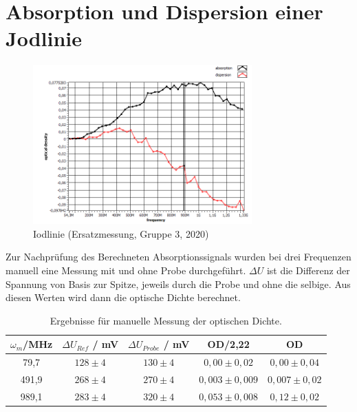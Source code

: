 
\newpage
\section{Absorption und Dispersion einer Jodlinie}


\begin{figure}[h]
    \centering
    \includegraphics[width=0.75\textwidth]{Bilder/Jodlinie/Gruppe32020Iododgraph1 Kopie.png}
    \caption[Iodlinie]{Iodlinie (Ersatzmessung, Gruppe 3, 2020)}
\end{figure}


Zur Nachprüfung des Berechneten Absorptionssignals wurden bei drei Frequenzen manuell eine Messung mit und ohne Probe durchgeführt. $\Delta U$ ist die Differenz der Spannung von Basis zur Spitze, jeweils durch die Probe und ohne die selbige. Aus diesen Werten wird dann die optische Dichte berechnet.


\begin{table}[h]
    \centering
    \begin{tabular}{c|cc|cc}
        $\omega_m$/MHz & $\Delta U_{Ref}$ / mV & $\Delta U_{Probe}$ / mV & OD/2,22 & OD \\ \hline
        79,7 & $128 \pm 4$ & $130 \pm 4$ & $0,00 \pm 0,02$ & $0,00 \pm 0,04$ \\
        491,9 & $268 \pm 4$ & $270 \pm 4$ & $0,003 \pm 0,009$ & $0,007 \pm 0,02$ \\
        989,1 & $283 \pm 4$ & $320 \pm 4$ & $0,053 \pm 0,008$ & $0,12 \pm 0,02$ \\
    \end{tabular}
    \caption{Ergebnisse für manuelle Messung der optischen Dichte.}
\end{table}

